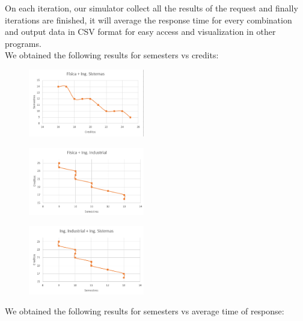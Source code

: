 \documentclass[journal]{IEEEtran}
\begin{document}
On each iteration, our simulator collect all the results of the request and finally iterations are finished, it will average the response time for every combination and output data in CSV format for easy access and visualization in other programs.\\

We obtained the following results for semesters vs credits:\\

\begin{figure}[h!]
    \centering
    \includegraphics[width=0.45\textwidth]{img/fissis}
    \label{fis_sis}
\end{figure}

\begin{figure}[h!]
    \centering
    \includegraphics[width=0.45\textwidth]{img/fisind}

    \label{fis_ind}
\end{figure}

\begin{figure}[h!]
    \centering
    \includegraphics[width=0.45\textwidth]{img/indsis}

    \label{ind_sis}
\end{figure}

\newpage 

We obtained the following results for semesters vs average time of response:\\
\end{document}
